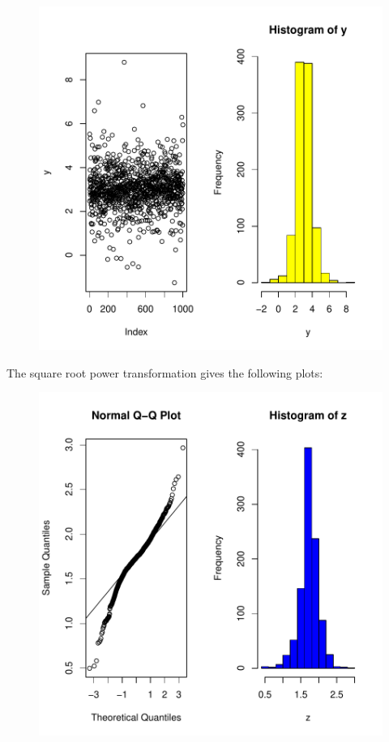 \documentclass[12pt]{article}
\begin{document}
\begin{figure}[H]
\includegraphics{HW1-009}
\end{figure}

\clearpage
\item The square root power transformation gives the following plots:
\begin{figure}[H]
\includegraphics{HW1-010}
\end{figure}
\end{document}
